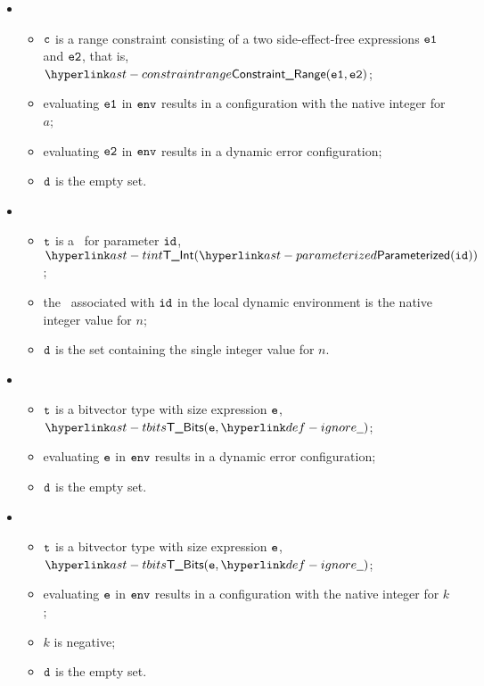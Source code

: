 \begin{itemize}
  \item {}
  \begin{itemize}
    \item $\texttt{c}$ is a range constraint consisting of a two side-effect-free expressions $\texttt{e1}$ and $\texttt{e2}$, that is, $\ConstraintRange(\veone, \vetwo)$;
    \item evaluating $\texttt{e1}$ in $\texttt{env}$ results in a configuration with the native integer for $a$;
    \item evaluating $\texttt{e2}$ in $\texttt{env}$ results in a dynamic error configuration;
    \item $\texttt{d}$ is the empty set.
  \end{itemize}

  \item {}
  \begin{itemize}
    \item $\texttt{t}$ is a \parameterizedintegertype\ for parameter $\texttt{id}$, \\ $\TInt(\parameterized(\id))$;
    \item the \nativevalue\ associated with $\texttt{id}$ in the local dynamic environment is the native integer value for $n$;
    \item $\texttt{d}$ is the set containing the single integer value for $n$.
  \end{itemize}

  \item {}
  \begin{itemize}
    \item $\texttt{t}$ is a bitvector type with size expression $\texttt{e}$, $\TBits(\ve, \Ignore)$;
    \item evaluating $\texttt{e}$ in $\texttt{env}$ results in a dynamic error configuration;
    \item $\texttt{d}$ is the empty set.
  \end{itemize}

  \item {}
  \begin{itemize}
    \item $\texttt{t}$ is a bitvector type with size expression $\texttt{e}$, $\TBits(\ve, \Ignore)$;
    \item evaluating $\texttt{e}$ in $\texttt{env}$ results in a configuration with the native integer for $k$;
    \item $k$ is negative;
    \item $\texttt{d}$ is the empty set.
  \end{itemize}


\end{itemize}
